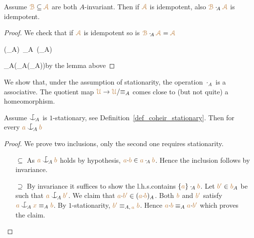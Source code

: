 \documentclass[creche.tex]{subfiles}
\begin{document}
\begin{corollary}\label{corol_min_idempotent}
Assume ${\color{brown}\EuScript B}\subseteq{\color{brown}{\EuScript A}}$ are both $A$-invariant.
Then if ${\color{brown}{\EuScript A}}$ is idempotent,
also ${\color{brown}\EuScript B}\cdot_{\!A}{\color{brown}{\EuScript A}}$ is idempotent.
\end{corollary}
\begin{proof}
We check that if ${\color{brown}{\EuScript A}}$ is idempotent so is ${\color{brown}\EuScript B}\cdot_{\!A}{\color{brown}{\EuScript A}}={\color{brown}{\EuScript A}}$

    {\subseteq}
    {\big(\mrB\cdot_{\!A}\mrA\big)\ \cdot_{\!A}\ \big(\mrA\cdot_{\!A}\mrA\big)}

\ceq{}
    {\subseteq}
    {\mrB\cdot_{\!A}\Big(\mrA\cdot_{\!A}\big(\mrA\cdot_{\!A}\mrA\big)\Big)}\hfill by the lemma above

% 
\end{proof}

We show that, under the assumption of stationarity,
the operation $\cdot_{\!A}$ is a associative.
The quotient map ${\color{brown}\EuScript U}\to{\color{brown}\EuScript U}/{\equiv_A}$ comes close to (but not quite) a homeomorphism.


\begin{proposition}\label{prop_orbits_main}
Assume $\nonforkc_{\!A}$ is $1$-stationary,
see Definition~\ref{def_coheir_stationary}.
Then for every ${\mr a}\nonforkc_{\!A}{\mr b}$ 

\end{proposition}
\begin{proof} 
We prove two inclusions,
only the second one requires stationarity.

\begin{itemize}
\item[$\subseteq$] As ${\mr a}\nonforkc_{\!A}{\mr b}$ holds by hypothesis,
${\color{brown} a}{\cdot}{\color{brown} b}\in{\color{brown}a}\cdot_{\!A}{\color{brown} b}$.
Hence the inclusion follows by invariance.

\item[$\supseteq$] By invariance it suffices to show the l.h.s.\@ contains $\{{\color{brown} a}\}\cdot_{\!A}{\color{brown} b}$.
Let ${\color{brown} b'}\in{\color{brown}b}_A$ be such that ${\mr a}\nonforkc_{\!A}{\mr b'}$.
We claim that ${\color{brown} a}{\cdot}{\color{brown} b'}\in({\color{brown} a}{\cdot}{\color{brown} b})_A$.
Both ${\color{brown} b}$ and ${\color{brown} b'}$ satisfy ${\mr a}\nonforkc_{\!A}{\mr x}\equiv_A{\mr b}$.
By $1$-stationarity,
${\color{brown} b'}\equiv_{A,\,{\color{brown} a}}{\color{brown} b}$.
Hence ${\color{brown} a}{\cdot}{\color{brown} b}\equiv_A{\color{brown} a}{\cdot}{\color{brown} b'}$ which proves the claim.
\end{itemize}\baselineskip
\end{proof}
\end{document}
